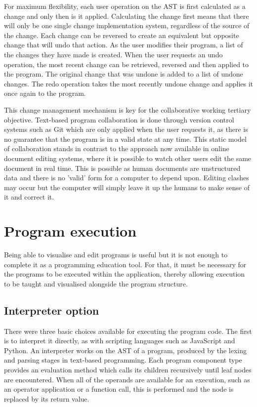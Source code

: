 For maximum flexibility, each user operation on the AST is first calculated as a change and only then is it applied. Calculating the change first means that there will only be one single change implementation system, regardless of the source of the change. Each change can be reversed to create an equivalent but opposite change that will undo that action. As the user modifies their program, a list of the changes they have made is created. When the user requests an undo operation, the most recent change can be retrieved, reversed and then applied to the program. The original change that was undone is added to a list of undone changes. The redo operation takes the most recently undone change and applies it once again to the program. 

This change management mechanism is key for the collaborative working tertiary objective. Text-based program collaboration is done through version control systems such as Git which are only applied when the user requests it, as there is no guarantee that the program is in a valid state at any time. This static model of collaboration stands in contrast to the approach now available in online document editing systems, where it is possible to watch other users edit the same document in real time. This is possible as human documents are unstructured data and there is no 'valid' form for a computer to depend upon. Editing clashes may occur but the computer will simply leave it up the humans to make sense of it and correct it.

\section{Program execution}

Being able to visualise and edit programs is useful but it is not enough to complete it as a programming education tool. For that, it must be necessary for the programs to be executed within the application, thereby allowing execution to be taught and visualised alongside the program structure.

\subsection{Interpreter option}

There were three basic choices available for executing the program code. The first is to interpret it directly, as with scripting languages such as JavaScript and Python. An interpreter works on the AST of a program, produced by the lexing and parsing stages in text-based programming. Each program component type provides an evaluation method which calls its children recursively until leaf nodes are encountered. When all of the operands are available for an execution, such as an operator application or a function call, this is performed and the node is replaced by its return value.

